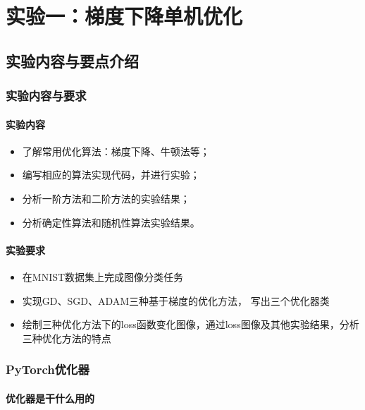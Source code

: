 \chapter{实验一：梯度下降单机优化}\label{chapter:task1}

\section{实验内容与要点介绍}

\subsection{实验内容与要求}

\subsubsection{实验内容}
\begin{itemize}
    \item 了解常用优化算法：梯度下降、牛顿法等；
    \item 编写相应的算法实现代码，并进行实验；
    \item 分析一阶方法和二阶方法的实验结果；
    \item 分析确定性算法和随机性算法实验结果。
\end{itemize}

\subsubsection{实验要求}
\begin{itemize}
    \item 在MNIST数据集上完成图像分类任务
    \item 实现GD、SGD、ADAM三种基于梯度的优化方法， 写出三个优化器类
    \item 绘制三种优化方法下的loss函数变化图像，通过loss图像及其他实验结果，分析三种优化方法的特点
\end{itemize}

\subsection{PyTorch优化器}

\subsubsection{优化器是干什么用的}

